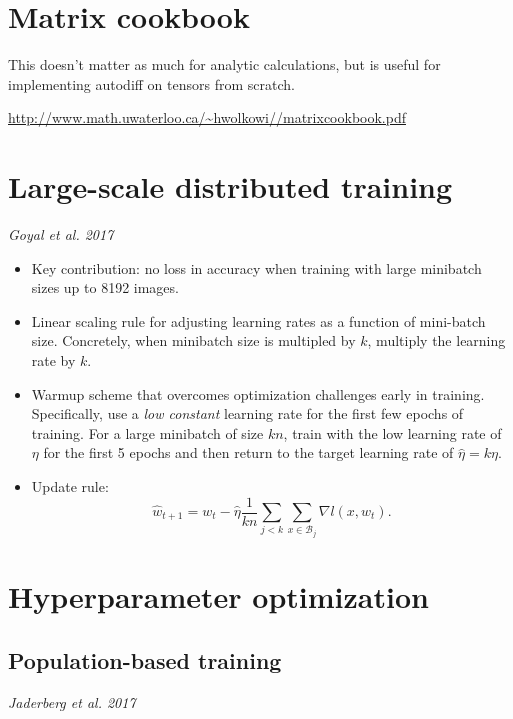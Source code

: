 \section{Matrix cookbook}

This doesn't matter as much for analytic calculations, but is useful for implementing autodiff on tensors from scratch.

\url{http://www.math.uwaterloo.ca/~hwolkowi//matrixcookbook.pdf}


\section{Large-scale distributed training}

{\it Goyal et al. 2017}

\begin{itemize}
  \item Key contribution: no loss in accuracy when training with large minibatch sizes up to 8192 images.
  \item Linear scaling rule for adjusting learning rates as a function of mini-batch size.  Concretely, when minibatch size is multipled by $k$, multiply the learning rate by $k$.
  \item Warmup scheme that overcomes optimization challenges early in training.  Specifically, use a {\it low constant} learning rate for the first few epochs of training.  For a large minibatch of size $kn$, train with the low learning rate of $\eta$ for the first 5 epochs and then return to the target learning rate of $\hat{\eta} = k \eta$.
  \item Update rule:
    \[
      \hat{w}_{t+1} = w_t - \hat{\eta} \frac{1}{kn} \sum_{j < k} \sum_{x \in \mathcal{B}_j} \nabla l (x, w_t).
    \]
\end{itemize}

\section{Hyperparameter optimization}

\subsection{Population-based training}

{\it Jaderberg et al. 2017}

